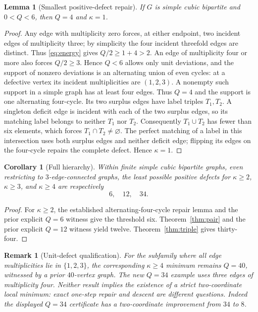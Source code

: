\documentclass[11pt]{article}
\newtheorem{lemma}[theorem]{Lemma}
\newtheorem{corollary}[theorem]{Corollary}
\newtheorem{remark}[theorem]{Remark}
\newcommand{\kk}{\kappa}
\begin{document}
\begin{lemma}[Smallest positive-defect repair]
If $G$ is simple cubic bipartite and $0<Q<6$, then $Q=4$ and $\kk=1$.
\end{lemma}
\begin{proof}
Any edge with multiplicity zero forces, at either endpoint, two incident edges of multiplicity three; by simplicity the four incident threefold edges are distinct. Thus \eqref{eq:energy} gives $Q/2\ge1+4>2$. An edge of multiplicity four or more also forces $Q/2\ge3$. Hence $Q<6$ allows only unit deviations, and the support of nonzero deviations is an alternating union of even cycles: at a defective vertex its incident multiplicities are $(1,2,3)$. A nonempty such support in a simple graph has at least four edges. Thus $Q=4$ and the support is one alternating four-cycle. Its two surplus edges have label triples $T_1,T_2$. A singleton deficit edge is incident with each of the two surplus edges, so its matching label belongs to neither $T_1$ nor $T_2$. Consequently $T_1\cup T_2$ has fewer than six elements, which forces $T_1\cap T_2\ne\varnothing$. The perfect matching of a label in this intersection uses both surplus edges and neither deficit edge; flipping its edges on the four-cycle repairs the complete defect. Hence $\kk=1$.
\end{proof}

\begin{corollary}[Full hierarchy]\label{cor:hierarchy}
Within finite simple cubic bipartite graphs, even restricting to $3$-edge-connected graphs, the least possible positive defects for $\kk\ge2$, $\kk\ge3$, and $\kk\ge4$ are respectively
\[\boxed{6,\quad12,\quad34}.\]
\end{corollary}
\begin{proof}
For $\kk\ge2$, the established alternating-four-cycle repair lemma and the prior explicit $Q=6$ witness give the threshold six. Theorem~\ref{thm:pair} and the prior explicit $Q=12$ witness yield twelve. Theorem~\ref{thm:triple} gives thirty-four.
\end{proof}

\begin{remark}[Unit-defect qualification]
For the subfamily where all edge multiplicities lie in $\{1,2,3\}$, the corresponding $\kk\ge4$ minimum remains $Q=40$, witnessed by a prior $40$-vertex graph. The new $Q=34$ example uses three edges of multiplicity four. Neither result implies the existence of a strict two-coordinate local minimum: exact one-step repair and descent are different questions. Indeed the displayed $Q=34$ certificate has a two-coordinate improvement from $34$ to $8$.
\end{remark}
\end{document}

